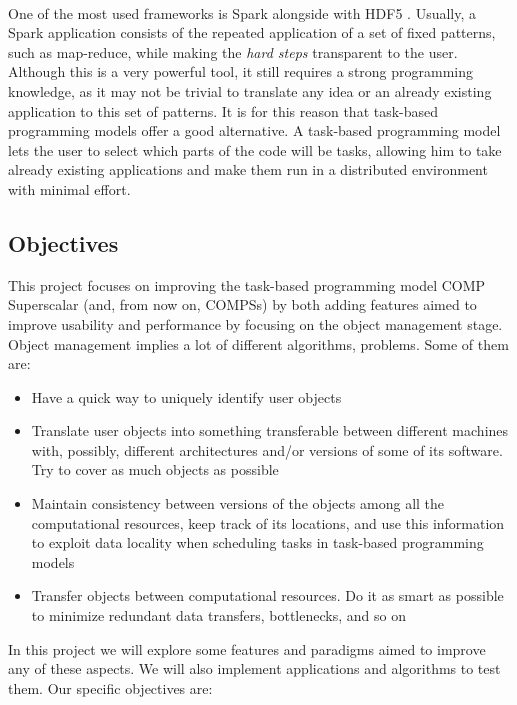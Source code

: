 \\
One of the most used frameworks is Spark \cite{Zaharia:2010:SCC:1863103.1863113} alongside with HDF5 \cite{shvachko2010hadoop}. Usually, a Spark application consists of the repeated application of a set of fixed patterns, such as map-reduce, while making the \textit{hard steps} transparent to the user. Although this is a very powerful tool, it still requires a strong programming knowledge, as it may not be trivial to translate any idea or an already existing application to this set of patterns. It is for this reason that task-based programming models offer a good alternative. A task-based programming model lets the user to select which parts of the code will be tasks, allowing him to take already existing applications and make them run in a distributed environment with minimal effort.


\subsection{Objectives}
\label{subsec:intro_objectives}
This project focuses on improving the task-based programming model COMP Superscalar (and, from now on, COMPSs) \cite{compss} by both adding features aimed to improve usability and performance by focusing on the object management stage. Object management implies a lot of different algorithms, problems. Some of them are:
\begin{itemize}
\item Have a quick way to uniquely identify user objects
\item Translate user objects into something transferable between different machines with, possibly, different architectures and/or versions of some of its software. Try to cover as much objects as possible
\item Maintain consistency between versions of the objects among all the computational resources, keep track of its locations, and use this information to exploit data locality when scheduling tasks in task-based programming models
\item Transfer objects between computational resources. Do it as smart as possible to minimize redundant data transfers, bottlenecks, and so on
\end{itemize}
In this project we will explore some features and paradigms aimed to improve any of these aspects. We will also implement applications and algorithms to test them. Our specific objectives are:


